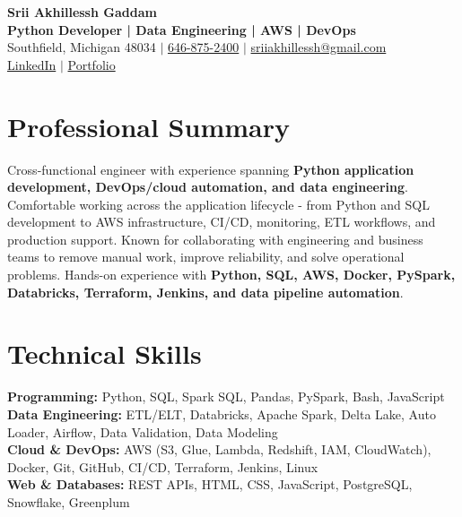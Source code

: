 \documentclass[letterpaper,10pt]{article}
\begin{document}
\fontsize{9.35pt}{10.45pt}\selectfont

\begin{center}
    {\LARGE \textbf{Srii Akhillessh Gaddam}} \\[-1pt]
    \textbf{Python Developer | Data Engineering | AWS | DevOps} \\[2pt]
    Southfield, Michigan 48034 $|$
    \href{tel:6468752400}{646-875-2400} $|$
    \href{mailto:sriiakhillessh@gmail.com}{sriiakhillessh@gmail.com} \\[1pt]
    \href{https://www.linkedin.com/in/srii-akhiilessh-gaddam-b48668191/}{LinkedIn} $|$
    \href{https://sriiakhillesshg.github.io/portfolio/}{Portfolio}
\end{center}
\vspace{-8pt}

\section{Professional Summary}
\small{Cross-functional engineer with experience spanning \textbf{Python application development, DevOps/cloud automation, and data engineering}. Comfortable working across the application lifecycle - from Python and SQL development to AWS infrastructure, CI/CD, monitoring, ETL workflows, and production support. Known for collaborating with engineering and business teams to remove manual work, improve reliability, and solve operational problems. Hands-on experience with \textbf{Python, SQL, AWS, Docker, PySpark, Databricks, Terraform, Jenkins, and data pipeline automation}.}

\section{Technical Skills}
\small{
\textbf{Programming:} Python, SQL, Spark SQL, Pandas, PySpark, Bash, JavaScript \\
\textbf{Data Engineering:} ETL/ELT, Databricks, Apache Spark, Delta Lake, Auto Loader, Airflow, Data Validation, Data Modeling \\
\textbf{Cloud \& DevOps:} AWS (S3, Glue, Lambda, Redshift, IAM, CloudWatch), Docker, Git, GitHub, CI/CD, Terraform, Jenkins, Linux \\
\textbf{Web \& Databases:} REST APIs, HTML, CSS, JavaScript, PostgreSQL, Snowflake, Greenplum
}
\end{document}

